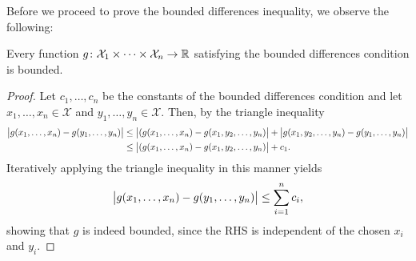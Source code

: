 Before we proceed to prove the bounded differences inequality, we observe the following:

\begin{lemma}
\label{lem: bounded differences condition}
Every function $g \colon \mathcal{X}_1 \times \dots \times \mathcal{X}_n \to \mathbb{R}$ satisfying the bounded differences condition is bounded.
\end{lemma}

\begin{proof}
Let $c_1, \dots, c_n$ be the constants of the bounded differences condition and let $x_1, \dots, x_n \in \mathcal{X}$ and $y_1, \dots, y_n \in \mathcal{X}$. Then, by the triangle inequality
\begin{align*}
    \big\lvert g(x_1, \dots, x_n) - g(y_1, \dots, y_n) \big\rvert &\leq \big\lvert (g(x_1, \dots, x_n) - g(x_1, y_2, \dots, y_n) \big\rvert + \big\lvert g(x_1, y_2, \dots, y_n) - g(y_1, \dots, y_n) \big\rvert \\
        &\leq \big\lvert (g(x_1, \dots, x_n) - g(x_1, y_2, \dots, y_n) \big\rvert + c_1.
\end{align*}
Iteratively applying the triangle inequality in this manner yields
\[
    \big\lvert g(x_1, \dots, x_n) - g(y_1, \dots, y_n) \big\rvert \leq \sum_{i=1}^n c_i,
\]
showing that $g$ is indeed bounded, since the RHS is independent of the chosen $x_i$ and $y_i$.
\end{proof}

